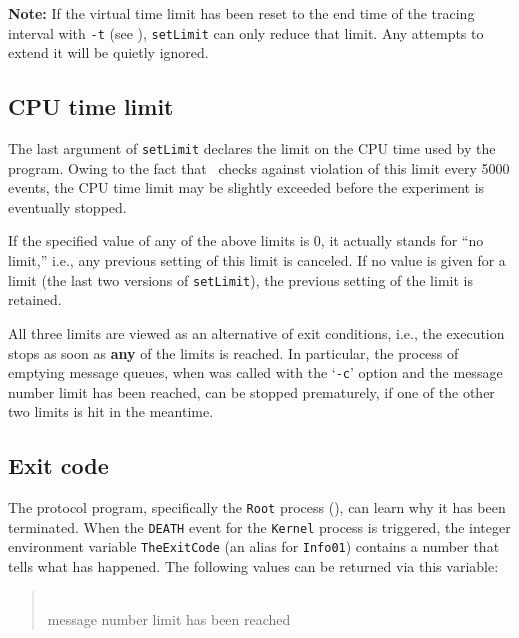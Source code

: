 \noindent
{\bf Note:}
If the virtual time limit has been reset
to the end time of the tracing interval with {\tt -t} (see ),
{\tt setLimit} can only reduce that limit.
Any attempts to extend it will be quietly ignored.

\subsection{CPU time limit}
\label{rm_ts_cp}

The last argument of {\tt setLimit} declares the limit on the CPU time used
by the program.
Owing to the fact that \smurph\ checks against violation of this limit
every 5000 events, the CPU time limit
may be slightly exceeded before the experiment is eventually stopped.

\medskip

If the specified value of any of the above limits is 0, it actually stands
for ``no limit,'' i.e., any previous setting of this limit is canceled.
If no value is given for a limit (the last two versions of {\tt setLimit}),
the previous setting of the limit is retained.

All three limits are viewed as an alternative of exit conditions, i.e.,
the execution stops as soon as {\bf any} of the limits is
reached.
In particular, the process of emptying message queues, when {\smurph}
was called with the `{\tt -c}' option and the message number limit has been
reached, can be stopped prematurely, if one of the other two limits
is hit in the meantime.

\subsection{Exit code}
\label{rm_ts_ec}

The protocol program, specifically the {\tt Root} process (),
can learn why it has been terminated.
When the {\tt DEATH} event for the {\tt Kernel} process is triggered,
the integer environment variable {\tt TheExitCode} (an alias for {\tt Info01})
contains a number that tells what has happened.
The following values can be returned via this variable:

\medskip

\begin{quote}
\noindent{}\\ \hspace{0in}
message number limit has been reached
\end{quote}

